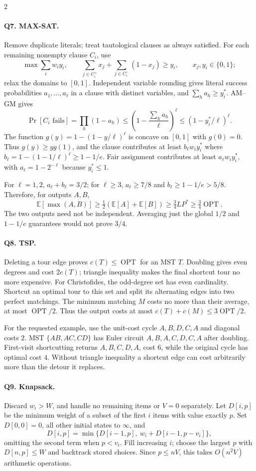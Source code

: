 \documentclass[10pt]{article}
\theoremstyle{definition}
\newcommand{\OPT}{\operatorname{OPT}}
\begin{document}
\begin{multicols*}{2}
\paragraph{Q7. MAX-SAT.}
Remove duplicate literals; treat tautological clauses as always satisfied.
For each remaining nonempty clause $C_i$, use
\[
\max\sum_iw_iy_i,\qquad
\sum_{j\in C_i^+}x_j+\sum_{j\in C_i^-}(1-x_j)\ge y_i,
\qquad x_j,y_i\in\{0,1\};
\]
relax the domains to $[0,1]$.  Independent variable rounding gives literal
success probabilities $a_1,\ldots,a_\ell$ in a clause with distinct
variables, and $\sum_h a_h\ge y_i^*$.  AM--GM gives
\[
\Pr[C_i\text{ fails}]=\prod_h(1-a_h)
\le\left(1-\frac{\sum_h a_h}{\ell}\right)^\ell
\le(1-y_i^*/\ell)^\ell.
\]
The function $g(y)=1-(1-y/\ell)^\ell$ is concave on $[0,1]$ with
$g(0)=0$.  Thus $g(y)\ge yg(1)$, and the clause contributes at least
$b_\ell w_i y_i^*$ where $b_\ell=1-(1-1/\ell)^\ell\ge1-1/e$.
Fair assignment contributes at least $a_\ell w_i y_i^*$, with
$a_\ell=1-2^{-\ell}$ because $y_i^*\le1$.

For $\ell=1,2$, $a_\ell+b_\ell=3/2$; for $\ell\ge3$,
$a_\ell\ge7/8$ and $b_\ell\ge1-1/e>5/8$.  Therefore, for outputs $A,B$,
\[
\mathbb E[\max(A,B)]\ge\tfrac12(\mathbb E[A]+\mathbb E[B])
\ge\tfrac34 LP^*\ge\tfrac34\OPT.
\]
The two outputs need not be independent.  Averaging just the global
$1/2$ and $1-1/e$ guarantees would not prove $3/4$.

\paragraph{Q8. TSP.}
Deleting a tour edge proves $c(T)\le\OPT$ for an MST $T$.  Doubling gives
even degrees and cost $2c(T)$; triangle inequality makes the final shortcut
tour no more expensive.  For Christofides, the odd-degree set has even
cardinality.  Shortcut an optimal tour to this set and split its alternating
edges into two perfect matchings.  The minimum matching $M$ costs no more
than their average, at most $\OPT/2$.  Thus the output costs at most
$c(T)+c(M)\le3\OPT/2$.

For the requested example, use the unit-cost cycle $A,B,D,C,A$ and diagonal
costs $2$.  MST $\{AB,AC,CD\}$ has Euler circuit $A,B,A,C,D,C,A$ after
doubling.  First-visit shortcutting returns $A,B,C,D,A$, cost $6$, while
the original cycle has optimal cost $4$.  Without triangle inequality a
shortcut edge can cost arbitrarily more than the detour it replaces.

\paragraph{Q9. Knapsack.}
Discard $w_i>W$, and handle no remaining items or $V=0$ separately.
Let $D[i,p]$ be the minimum weight of a subset of the first $i$ items with
value exactly $p$.  Set $D[0,0]=0$, all other initial states to $\infty$, and
\[
D[i,p]=\min\{D[i-1,p],\ w_i+D[i-1,p-v_i]\},
\]
omitting the second term when $p<v_i$.  Fill increasing $i$; choose the
largest $p$ with $D[n,p]\le W$ and backtrack stored choices.  Since
$p\le nV$, this takes $O(n^2V)$ arithmetic operations.


\end{multicols*}
\end{document}
